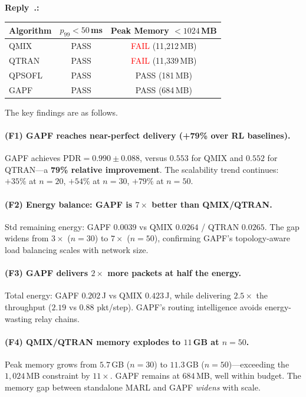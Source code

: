 \documentclass[11pt]{article}
\newcounter{reviewer}
\newcounter{replyctr}[reviewer]
\renewcommand{\thereplyctr}{\thereviewer.\arabic{replyctr}}
\newenvironment{reply}
  {\refstepcounter{replyctr}%
   \addtocounter{replyctr}{-1}%
   \medskip\noindent
   \begin{sf}\textbf{Reply~\thereplyctr:}\ }
  {\addtocounter{replyctr}{1}%
   \medskip\end{sf}}
\begin{document}
\begin{refsection}
\begin{mdframed}[style=Resp]
\begin{reply}
\begin{center}
\label{tab:constraints_n50_r35}
\begin{tabular}{lcc}
\toprule
Algorithm & $p_{99} < 50$\,ms & Peak Memory $< 1024$\,MB \\
\midrule
QMIX   & \textcolor{green!60!black}{PASS} & \textcolor{red}{FAIL} (11{,}212\,MB) \\
QTRAN  & \textcolor{green!60!black}{PASS} & \textcolor{red}{FAIL} (11{,}339\,MB) \\
QPSOFL & \textcolor{green!60!black}{PASS} & \textcolor{green!60!black}{PASS} (181\,MB) \\
GAPF   & \textcolor{green!60!black}{PASS} & \textcolor{green!60!black}{PASS} (684\,MB) \\
\bottomrule
\end{tabular}
\end{center}

The key findings are as follows.

\paragraph{(F1) GAPF reaches near-perfect delivery (+79\% over RL baselines).}
GAPF achieves $\text{PDR} = 0.990 \pm 0.088$, versus $0.553$ for QMIX and $0.552$ for QTRAN---a \textbf{79\% relative improvement}. The scalability trend continues: $+35\%$ at $n=20$, $+54\%$ at $n=30$, $+79\%$ at $n=50$.

\paragraph{(F2) Energy balance: GAPF is $7\times$ better than QMIX/QTRAN.}
Std remaining energy: GAPF $0.0039$ vs QMIX $0.0264$ / QTRAN $0.0265$. The gap widens from $3\times$ ($n=30$) to $7\times$ ($n=50$), confirming GAPF's topology-aware load balancing scales with network size.

\paragraph{(F3) GAPF delivers $2\times$ more packets at half the energy.}
Total energy: GAPF $0.202$\,J vs QMIX $0.423$\,J, while delivering $2.5\times$ the throughput ($2.19$ vs $0.88$ pkt/step). GAPF's routing intelligence avoids energy-wasting relay chains.

\paragraph{(F4) QMIX/QTRAN memory explodes to $11$\,GB at $n=50$.}
Peak memory grows from $5.7$\,GB ($n=30$) to $11.3$\,GB ($n=50$)---exceeding the $1{,}024$\,MB constraint by $11\times$. GAPF remains at $684$\,MB, well within budget. The memory gap between standalone MARL and GAPF \emph{widens} with scale.


\end{reply}
\end{mdframed}
\end{refsection}
\end{document}
